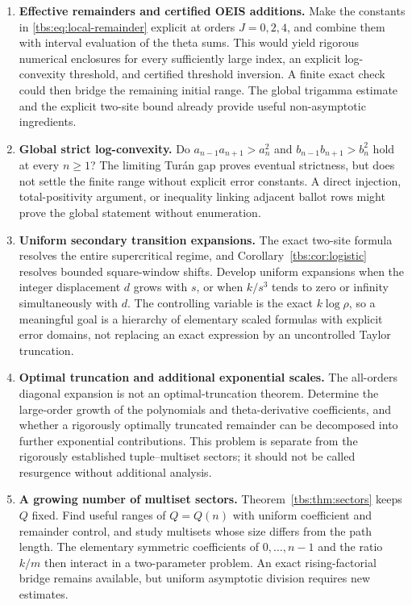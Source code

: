 \documentclass[11pt,a4paper]{article}
\numberwithin{equation}{section}
\theoremstyle{definition}
\begin{document}
\begin{enumerate}[leftmargin=*,label=\textbf{Q\arabic*.}]
\item \textbf{Effective remainders and certified OEIS additions.}
Make the constants in \eqref{tbs:eq:local-remainder} explicit at orders
$J=0,2,4$, and combine them with interval evaluation of the theta sums.
This would yield rigorous numerical enclosures for every sufficiently
large index, an explicit log-convexity threshold, and certified threshold
inversion. A finite exact check could then bridge the remaining initial
range. The global trigamma estimate and the explicit two-site bound
already provide useful non-asymptotic ingredients.

\item \textbf{Global strict log-convexity.}
Do $a_{n-1}a_{n+1}>a_n^2$ and $b_{n-1}b_{n+1}>b_n^2$ hold at every
$n\ge1$? The limiting Tur\'an gap proves eventual strictness, but does
not settle the finite range without explicit error constants. A direct
injection, total-positivity argument, or inequality linking adjacent
ballot rows might prove the global statement without enumeration.

\item \textbf{Uniform secondary transition expansions.}
The exact two-site formula resolves the entire supercritical regime,
and Corollary~\ref{tbs:cor:logistic} resolves bounded square-window shifts.
Develop uniform expansions when the integer displacement $d$ grows with
$s$, or when $k/s^3$ tends to zero or infinity simultaneously with $d$.
The controlling variable is the exact $k\log\rho$, so a meaningful goal
is a hierarchy of elementary scaled formulas with explicit error domains,
not replacing an exact expression by an uncontrolled Taylor truncation.

\item \textbf{Optimal truncation and additional exponential scales.}
The all-orders diagonal expansion is not an optimal-truncation theorem.
Determine the large-order growth of the polynomials and theta-derivative
coefficients, and whether a rigorously optimally truncated remainder can
be decomposed into further exponential contributions. This problem is
separate from the rigorously established tuple--multiset sectors; it
should not be called resurgence without additional analysis.

\item \textbf{A growing number of multiset sectors.}
Theorem~\ref{tbs:thm:sectors} keeps $Q$ fixed. Find useful ranges of
$Q=Q(n)$ with uniform coefficient and remainder control, and study
multisets whose size differs from the path length. The elementary
symmetric coefficients of $0,\ldots,n-1$ and the ratio $k/m$ then
interact in a two-parameter problem. An exact rising-factorial bridge
remains available, but uniform asymptotic division requires new estimates.


\end{enumerate}
\end{document}
